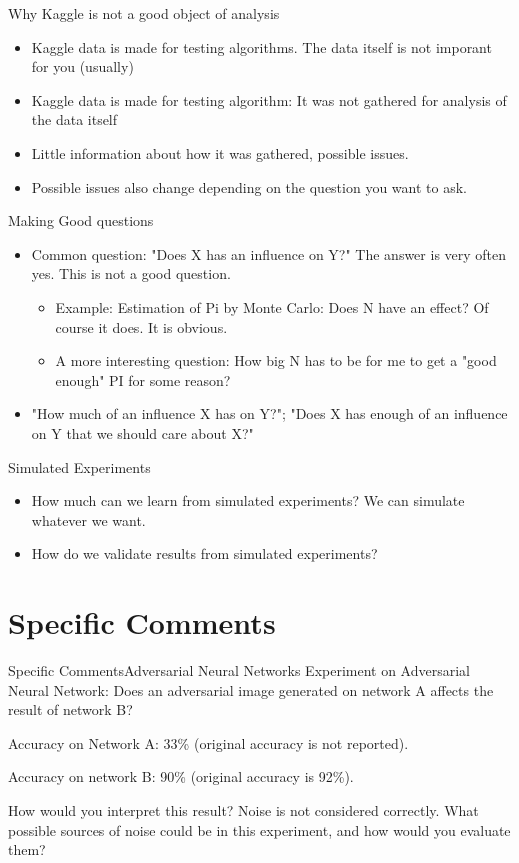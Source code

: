 \documentclass[aspectratio=169]{beamer}
\begin{document}
\begin{frame}{Why Kaggle is not a good object of analysis}
  \begin{itemize}
    \item Kaggle data is made for testing algorithms. The data itself is not imporant for you (usually)
    \item Kaggle data is made for testing algorithm: It was not gathered for analysis of the data itself
    \item Little information about how it was gathered, possible issues.
    \item Possible issues also change depending on the question you want to ask.
  \end{itemize}  
\end{frame}

\begin{frame}{Making Good questions}
  \begin{itemize}
    \item Common question: "Does X has an influence on Y?" The answer is very often yes. This is not a good question.
    \begin{itemize}
      \item Example: Estimation of Pi by Monte Carlo: Does N have an effect? Of course it does. It is obvious. 
      \item A more interesting question: How big N has to be for me to get a "good enough" PI for some reason?
    \end{itemize}
    \item "How much of an influence X has on Y?"; "Does X has enough of an influence on Y that we should care about X?"
  \end{itemize}
  
\end{frame}

\begin{frame}{Simulated Experiments}
  \begin{itemize}
    \item How much can we learn from simulated experiments? We can simulate whatever we want.
    \item How do we validate results from simulated experiments?
  \end{itemize}
\end{frame}

\section{Specific Comments}
\begin{frame}{Specific Comments}{Adversarial Neural Networks}
  Experiment on Adversarial Neural Network: Does an adversarial image generated on network A affects the result of network B? \bigskip
  
  Accuracy on Network A: 33\% (original accuracy is not reported). 
  
  Accuracy on network B: 90\% (original accuracy is 92\%). 
  \bigskip

  How would you interpret this result? Noise is not considered correctly. What possible sources of noise could be in this experiment, and how would you evaluate them?
\end{frame}
\end{document}
